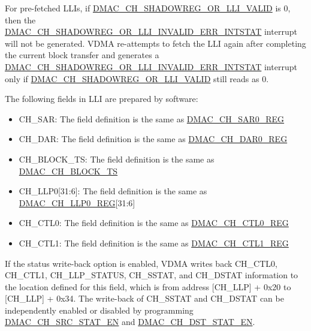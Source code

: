 \documentclass[main\_\_EN.tex]{subfiles}
\begin{document}
\begin{tiplisting}
    For pre-fetched LLIs, if \hyperref[fielddesc:DMACCHNSHADOWREGORLLIVALID]{DMAC\_CH\_SHADOWREG\_OR\_LLI\_VALID} is 0, then the \\\hyperref[fielddesc:DMACCHNSHADOWREGORLLIINVALIDERRINTSTAT]{DMAC\_CH\_SHADOWREG\_OR\_LLI\_INVALID\_ERR\_INTSTAT} interrupt will not be generated. VDMA re-attempts to fetch the LLI again after completing the current block transfer and generates a\\ \hyperref[fielddesc:DMACCHNSHADOWREGORLLIINVALIDERRINTSTAT]{DMAC\_CH\_SHADOWREG\_OR\_LLI\_INVALID\_ERR\_INTSTAT} interrupt only if \hyperref[fielddesc:DMACCHNSHADOWREGORLLIVALID]{DMAC\_CH\_SHADOWREG\_OR\_LLI\_VALID} still reads as 0.
\end{tiplisting}

The following fields in LLI are prepared by software:

\begin{itemize}
    \item CH\_SAR: The field definition is the same as \hyperref[regdesc:DMACCHNSAR0REG]{DMAC\_CH\_SAR0\_REG}
    \item CH\_DAR: The field definition is the same as \hyperref[regdesc:DMACCHNDAR0REG]{DMAC\_CH\_DAR0\_REG}
    \item CH\_BLOCK\_TS: The field definition is the same as \hyperref[fielddesc:DMACCHNBLOCKTS]{DMAC\_CH\_BLOCK\_TS}
    \item CH\_LLP0[31:6]: The field definition is the same as \hyperref[regdesc:DMACCHNLLP0REG]{DMAC\_CH\_LLP0\_REG}[31:6]
    \item CH\_CTL0: The field definition is the same as \hyperref[regdesc:DMACCHNCTL0REG]{DMAC\_CH\_CTL0\_REG}
    \item CH\_CTL1: The field definition is the same as \hyperref[regdesc:DMACCHNCTL1REG]{DMAC\_CH\_CTL1\_REG}
\end{itemize}

If the status write-back option is enabled, VDMA writes back CH\_CTL0, CH\_CTL1, CH\_LLP\_STATUS, CH\_SSTAT, and CH\_DSTAT information to the location defined for this field, which is from address [CH\_LLP] + 0x20 to [CH\_LLP] + 0x34. The write-back of CH\_SSTAT and CH\_DSTAT can be independently enabled or disabled by programming \hyperref[fielddesc:DMACCHNSRCSTATEN]{DMAC\_CH\_SRC\_STAT\_EN} and \hyperref[fielddesc:DMACCHNDSTSTATEN]{DMAC\_CH\_DST\_STAT\_EN}.
\end{document}

